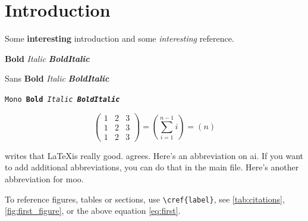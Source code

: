 \chapter{Introduction} \label{chap:introduction}

Some \textbf{interesting} \textsf{introduction} and some \emph{interesting} reference.
\par\textbf{Bold} \textit{Italic} \textbf{\textit{BoldItalic}}
\par\textsf{Sans \textbf{Bold} \textit{Italic} \textbf{\textit{BoldItalic}}}
\par\texttt{Mono \textbf{Bold} \textit{Italic} \textbf{\textit{BoldItalic}}}

\begin{equation}
    \begin{pmatrix}
      1 & 2 & 3  \\
      1 & 2 & 3  \\
      1 & 2 & 3
    \end{pmatrix}
    = \left( \sum_{i=1}^{n-1} i \right)
    = \left( n \right)
\label{eq:first}
\end{equation}

\textcite{Walley2000} writes that \LaTeX is really good. \textcite{entrywithurl} agrees. Here's an abbreviation on \gls{ai}. If you want to add additional abbreviations, you can do that in the main file. Here's another abbreviation for \gls{moo}.

To reference figures, tables or sections, use \verb|\cref{label}|, see \cref{tab:citations}, \cref{fig:first_figure}, or the above equation \cref{eq:first}.

